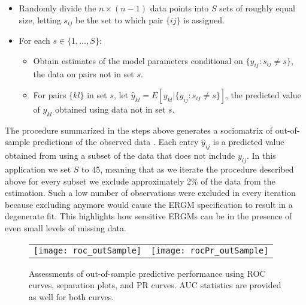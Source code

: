 \begin{itemize}
	\item Randomly divide the $n \times (n-1)$ data points into $S$ sets of roughly equal size, letting $s_{ij}$ be the set to which pair $\{ij\}$ is assigned.
	\item For each $s \in \{1, \ldots, S\}$:
	\begin{itemize}
		\item Obtain estimates of the model parameters conditional on $\{y_{ij} : s_{ij} \neq s\}$, the data on pairs not in set $s$.
		\item For pairs $\{kl\}$ in set $s$, let $\hat y_{kl} = E[y_{kl} | \{y_{ij} : s_{ij} \neq s\}]$, the predicted value of $y_{kl}$ obtained using data not in set $s$.
	\end{itemize}
\end{itemize}

The procedure summarized in the steps above generates a sociomatrix of out-of-sample predictions of the observed data \citep{hoff:2008}. Each entry $\hat y_{ij}$ is a predicted value obtained from using a subset of the data that does not include $y_{ij}$. In this application we set $S$ to 45, meaning that as we iterate the procedure described above for every subset we exclude approximately 2\% of the data from the estimation. Such a low number of observations were excluded in every iteration because excluding anymore would cause the ERGM specification to result in a degenerate fit. This highlights how sensitive ERGMs can be in the presence of even small levels of missing data. 

\begin{figure}[ht]
	\centering
	\begin{tabular}{cc}
	\texttt{[image: roc\_outSample]} & 
	\texttt{[image: rocPr\_outSample]}	
	\end{tabular}
	\caption{Assessments of out-of-sample predictive performance using ROC curves, separation plots, and PR curves. AUC statistics are provided as well for both curves.}
	\label{fig:roc}
\end{figure}
\FloatBarrier

